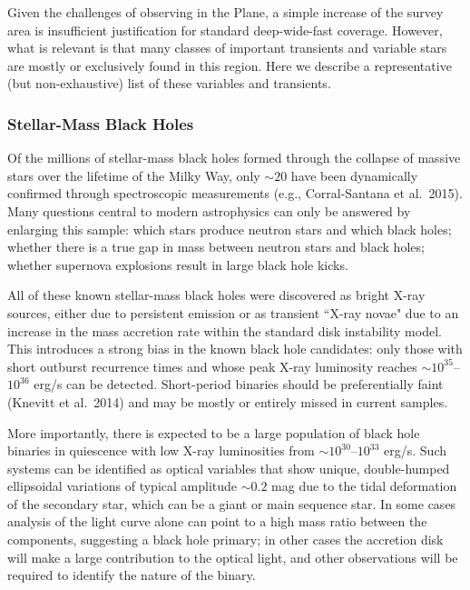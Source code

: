 Given the challenges of observing in the Plane, a simple increase of the survey area is insufficient justification for standard deep-wide-fast coverage. 
However, what is relevant is that many classes of important transients and variable stars are mostly or exclusively found in this region. Here we describe a 
representative (but non-exhaustive) list of these variables and transients.


\subsubsection{Stellar-Mass Black Holes}

Of the millions of stellar-mass black holes formed through the collapse of massive stars over the lifetime of the Milky Way, only $\sim 20$ have been 
dynamically confirmed through spectroscopic measurements (e.g., Corral-Santana et al.~2015). Many questions central to modern astrophysics can only be answered by enlarging this sample: which 
stars produce neutron stars and which black holes; whether there is a true gap in mass between neutron stars and black holes; whether supernova explosions 
result in large black hole kicks.

All of these known stellar-mass black holes were discovered  as bright X-ray sources, either due to persistent emission or as transient ``X-ray novae" 
due to an increase in the mass accretion rate within the standard  disk instability model. This introduces a strong bias in the known black hole candidates:
only those with short outburst recurrence times and whose peak X-ray luminosity reaches $\sim 10^{35}$--$10^{36}$ erg/s can be detected. 
Short-period binaries should be preferentially faint (Knevitt et al.~2014) and may be mostly or entirely missed in current samples.

More importantly, there is expected to be a large population of black hole binaries in quiescence with low X-ray luminosities from $\sim 10^{30}$--$10^{33}$ erg/s.
Such systems can be identified as optical variables that show unique, double-humped ellipsoidal variations of typical amplitude $\sim 0.2$ mag due to the tidal deformation of the secondary star, which can be a giant or main sequence star. In some cases analysis of the light curve alone can point to a high mass ratio between the components, suggesting a black hole primary;
in other cases the accretion disk will make a large contribution to the optical light, and other observations will be required to identify the nature of the binary.

